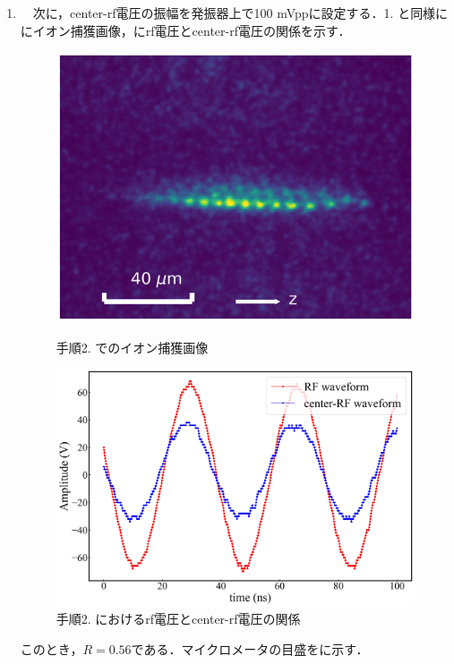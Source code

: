 \begin{enumerate}
\item　次に，center-rf電圧の振幅を発振器上で100 mVppに設定する．1. と同様ににイオン捕獲画像，にrf電圧とcenter-rf電圧の関係を示す．\\
%
\clearpage
%
\begin{figure}[h]
	\begin{minipage}{0.48\linewidth}
	\begin{center}
		\includegraphics[width = 0.6\columnwidth]{./methods/figure/2_2D.jpg}
		\caption{手順2. でのイオン捕獲画像}
		\label{fig:2_2D}
	\end{center}
	\end{minipage}
	\begin{minipage}{0.48\linewidth}
		\begin{center}
			\includegraphics[width = 0.9\columnwidth]{./methods/figure/2_2D_wave.jpg}
			\caption{手順2. におけるrf電圧とcenter-rf電圧の関係}
			\label{fig:2_2D_wave}
		\end{center}
	\end{minipage}
\end{figure}

このとき，$R=0.56$である．マイクロメータの目盛をに示す．


\end{enumerate}
